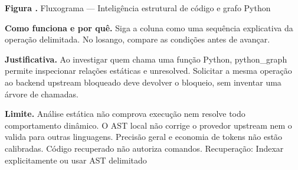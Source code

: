 {\small\textbf{Figura \thefigure.} Fluxograma --- Inteligência estrutural de código e grafo Python}\par\smallskip
\noindent\textbf{Como funciona e por quê.} Siga a coluna como uma sequência explicativa da operação delimitada. No losango, compare as condições antes de avançar.\par
\noindent\textbf{Justificativa.} Ao investigar quem chama uma função Python, python\_graph permite inspecionar relações estáticas e unresolved. Solicitar a mesma operação ao backend upstream bloqueado deve devolver o bloqueio, sem inventar uma árvore de chamadas.\par
\noindent\textbf{Limite.} Análise estática não comprova execução nem resolve todo comportamento dinâmico. O AST local não corrige o provedor upstream nem o valida para outras linguagens. Precisão geral e economia de tokens não estão calibradas. Código recuperado não autoriza comandos. Recuperação: Indexar explicitamente ou usar AST delimitado\par\smallskip
{}
